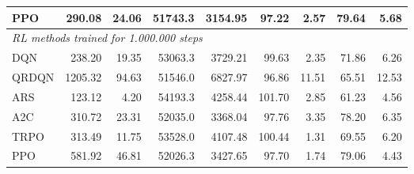 \begin{samepage}
\begin{center}
\begin{tabular}{l|rr|rr|rr|rr}
    PPO          &   290.08 &    24.06 &    51743.3 &    3154.95 &   97.22 &    2.57 &   79.64 &    5.68 \\
    \midrule
    \multicolumn{9}{l}{\textit{RL methods trained for 1.000.000 steps}} \\
    \midrule
    DQN          &   238.20 &    19.35 &    53063.3 &    3729.21 &   99.63 &    2.35 &   71.86 &    6.26 \\
    QRDQN        &  1205.32 &    94.63 &    51546.0 &    6827.97 &   96.86 &   11.51 &   65.51 &   12.53 \\
    ARS          &   123.12 &     4.20 &    54193.3 &    4258.44 &  101.70 &    2.85 &   61.23 &    4.56 \\
    A2C          &   310.72 &    23.31 &    52035.0 &    3368.04 &   97.76 &    3.35 &   78.20 &    6.35 \\
    TRPO         &   313.49 &    11.75 &    53528.0 &    4107.48 &  100.44 &    1.31 &   69.55 &    6.20 \\
    PPO          &   581.92 &    46.81 &    52026.3 &    3427.65 &   97.70 &    1.74 &   79.06 &    4.43 \\
    \bottomrule
  \end{tabular}
\end{center}
\end{samepage}


